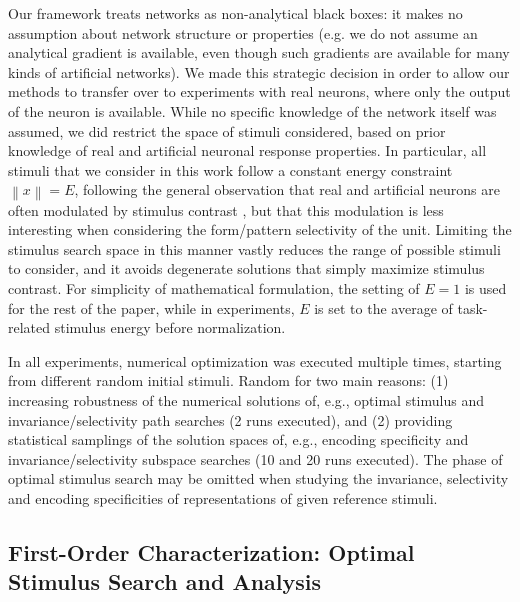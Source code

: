 Our framework treats networks as non-analytical black boxes: it makes no assumption about network structure or properties (e.g. we do not assume an analytical gradient is available, even though such gradients are available for many kinds of artificial networks). We made this strategic decision in order to allow our methods to transfer over to experiments with real neurons, where only the output of the neuron is available.  While no specific knowledge of the network itself was assumed, we did restrict the space of stimuli considered, based on prior knowledge of real and artificial neuronal response properties.  In particular, all stimuli that we consider in this work follow a constant energy constraint $\left\| x \right\| = E$, following the general observation that real and artificial neurons are often modulated by stimulus contrast \cite{albrecht1982striate, cheng1994comparison}, but that this modulation is less interesting when considering the form/pattern selectivity of the unit. Limiting the stimulus search space in this manner vastly reduces the range of possible stimuli to consider, and it avoids degenerate solutions that simply maximize stimulus contrast.
For simplicity of mathematical formulation, the setting of $E=1$ is used for the rest of the paper, while in experiments, $E$ is set to the average of task-related stimulus energy before normalization.

In all experiments, numerical optimization was executed multiple times, starting from different random initial stimuli.  Random  for two main reasons: (1) increasing robustness of the numerical solutions of, e.g., optimal stimulus and invariance/selectivity path searches (2 runs executed), and (2) providing statistical samplings of the solution spaces of, e.g., encoding specificity and invariance/selectivity subspace searches (10 and 20 runs executed). The phase of optimal stimulus search may be omitted when studying the invariance, selectivity and encoding specificities of representations of given reference stimuli.


\subsection*{First-Order Characterization: Optimal Stimulus Search and Analysis}

